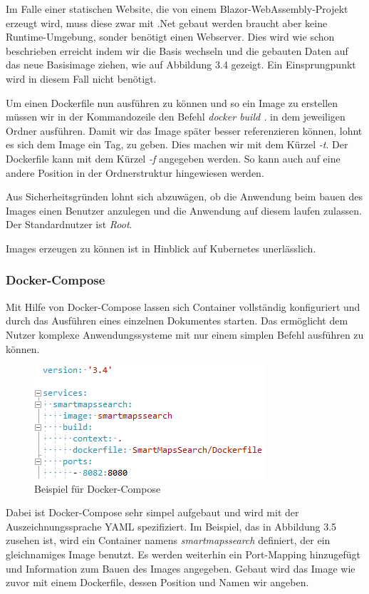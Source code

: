\documentclass[12pt,a4paper]{scrartcl}
\begin{document}
Im Falle einer statischen Website, die von einem Blazor-WebAssembly-Projekt erzeugt wird, muss diese zwar mit .Net gebaut werden braucht aber keine Runtime-Umgebung, sonder benötigt einen Webserver.
Dies wird wie schon beschrieben erreicht indem wir die Basis wechseln und die gebauten Daten auf das neue Basisimage ziehen, wie auf Abbildung 3.4 gezeigt. Ein Einsprungpunkt wird in diesem Fall nicht benötigt.

Um einen Dockerfile nun ausführen zu können und so ein Image zu erstellen müssen wir in der Kommandozeile den Befehl \emph{docker build .} in dem jeweiligen Ordner ausführen. Damit wir das Image später besser referenzieren können, lohnt es sich dem Image ein Tag, zu geben. Dies machen wir mit dem Kürzel \emph{-t}. Der Dockerfile kann mit dem Kürzel \emph{-f} angegeben werden. So kann auch auf eine andere Position in der Ordnerstruktur hingewiesen werden.

Aus Sicherheitsgründen lohnt sich abzuwägen, ob die Anwendung beim bauen des Images einen Benutzer anzulegen und die Anwendung auf diesem laufen zulassen. Der Standardnutzer ist \emph{Root}.

Images erzeugen zu können ist in Hinblick auf Kubernetes unerlässlich.

\subsubsection{Docker-Compose}

Mit Hilfe von Docker-Compose lassen sich Container vollständig konfiguriert und durch das Ausführen eines einzelnen Dokumentes starten. Das ermöglicht dem Nutzer komplexe Anwendungssysteme mit nur einem simplen Befehl ausführen zu können. 

\begin{figure}[h!]
	\centering
	\includegraphics[scale=1]{DockerComposeMin.png}
	\caption[Screenshot]{Beispiel für Docker-Compose}
\end{figure}

Dabei ist Docker-Compose sehr simpel aufgebaut und wird mit der Auszeichnungssprache YAML spezifiziert. Im Beispiel, das in Abbildung 3.5 zusehen ist, wird ein Container namens \emph{smartmapssearch} definiert, der ein gleichnamiges Image benutzt. Es werden weiterhin ein Port-Mapping hinzugefügt und Information zum Bauen des Images angegeben. Gebaut wird das Image wie zuvor mit einem Dockerfile, dessen Position und Namen wir angeben. 
\end{document}

